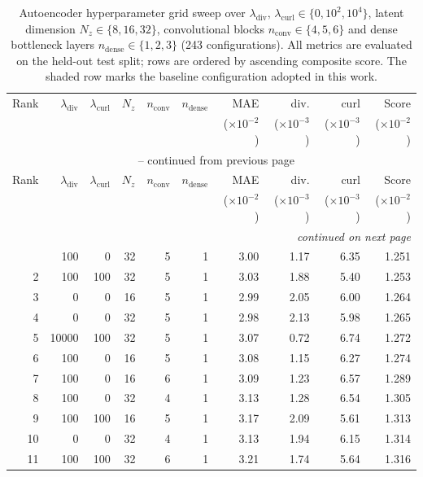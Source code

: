 \begin{footnotesize}
\begin{longtable}{@{}rrrrrrrrrr@{}}
\caption{Autoencoder hyperparameter grid sweep over $\lambda_\text{div},\,\lambda_\text{curl} \in \{0,10^2,10^4\}$, latent dimension $N_z \in \{8,16,32\}$, convolutional blocks $n_\text{conv} \in \{4,5,6\}$ and dense bottleneck layers $n_\text{dense} \in \{1,2,3\}$ (243 configurations). All metrics are evaluated on the held-out test split; rows are ordered by ascending composite score. The shaded row marks the baseline configuration adopted in this work.}
\label{tab: ae_grid_sweep} \\
\toprule
Rank & $\lambda_\text{div}$ & $\lambda_\text{curl}$ & $N_z$ & $n_\text{conv}$ & $n_\text{dense}$ & MAE & div. & curl & Score \\
 &  &  &  &  &  & ($\times10^{-2}$) & ($\times10^{-3}$) & ($\times10^{-3}$) & ($\times10^{-2}$) \\
\midrule
\endfirsthead
\multicolumn{10}{c}{\tablename\ \thetable{} -- continued from previous page} \\
\toprule
Rank & $\lambda_\text{div}$ & $\lambda_\text{curl}$ & $N_z$ & $n_\text{conv}$ & $n_\text{dense}$ & MAE & div. & curl & Score \\
 &  &  &  &  &  & ($\times10^{-2}$) & ($\times10^{-3}$) & ($\times10^{-3}$) & ($\times10^{-2}$) \\
\midrule
\endhead
\midrule \multicolumn{10}{r}{\textit{continued on next page}} \\
\endfoot
\bottomrule
\endlastfoot
1 & 100 & 0 & 32 & 5 & 1 & 3.00 & 1.17 & 6.35 & 1.251 \\
2 & 100 & 100 & 32 & 5 & 1 & 3.03 & 1.88 & 5.40 & 1.253 \\
3 & 0 & 0 & 16 & 5 & 1 & 2.99 & 2.05 & 6.00 & 1.264 \\
4 & 0 & 0 & 32 & 5 & 1 & 2.98 & 2.13 & 5.98 & 1.265 \\
5 & 10000 & 100 & 32 & 5 & 1 & 3.07 & 0.72 & 6.74 & 1.272 \\
6 & 100 & 0 & 16 & 5 & 1 & 3.08 & 1.15 & 6.27 & 1.274 \\
7 & 100 & 0 & 16 & 6 & 1 & 3.09 & 1.23 & 6.57 & 1.289 \\
8 & 100 & 0 & 32 & 4 & 1 & 3.13 & 1.28 & 6.54 & 1.305 \\
\rowcolor{baselinegrey} 9 & 100 & 100 & 16 & 5 & 1 & 3.17 & 2.09 & 5.61 & 1.313 \\
10 & 0 & 0 & 32 & 4 & 1 & 3.13 & 1.94 & 6.15 & 1.314 \\
11 & 100 & 100 & 32 & 6 & 1 & 3.21 & 1.74 & 5.64 & 1.316 \\

\end{longtable}
\end{footnotesize}
